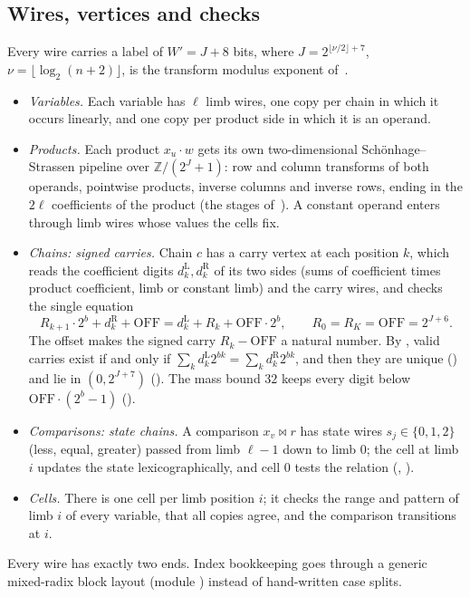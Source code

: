 \documentclass[10pt]{amsart}
\theoremstyle{plain}
\theoremstyle{definition}
\theoremstyle{remark}
\numberwithin{equation}{section}
\newcommand{\Z}{\mathbb{Z}}
\begin{document}
\subsection{Wires, vertices and checks}
Every wire carries a label of $W'=J+8$ bits, where $J=2^{\lfloor\nu/2\rfloor+7}$, $\nu=\lfloor\log_2(n+2)\rfloor$,
is the transform modulus exponent of~\cite{TulFac26}.
\begin{itemize}
\item \emph{Variables.} Each variable has $\ell$ limb wires, one copy per chain in which it occurs linearly,
and one copy per product side in which it is an operand.
\item \emph{Products.} Each product $x_u\cdot w$ gets its own two-dimensional Sch\"onhage--Strassen pipeline
over $\Z/(2^J+1)$: row and column transforms of both operands, pointwise products, inverse columns and
inverse rows, ending in the $2\ell$ coefficients of the product (the stages of~\cite[\S4]{TulFac26}).
A constant operand enters through limb wires whose values the cells fix.
\item \emph{Chains: signed carries.} Chain $c$ has a carry vertex at each position $k$, which reads the
coefficient digits $d^{\mathrm{L}}_k,d^{\mathrm{R}}_k$ of its two sides (sums of coefficient times product
coefficient, limb or constant limb) and the carry wires, and checks the single equation
\begin{equation}\label{eq:carry}
  R_{k+1}\cdot2^b+d^{\mathrm{R}}_k+\mathrm{OFF}=d^{\mathrm{L}}_k+R_k+\mathrm{OFF}\cdot2^b,
  \qquad R_0=R_K=\mathrm{OFF}=2^{J+6}.
\end{equation}
The offset makes the signed carry $R_k-\mathrm{OFF}$ a natural number. By , valid
carries exist if and only if $\sum_kd^{\mathrm{L}}_k2^{bk}=\sum_kd^{\mathrm{R}}_k2^{bk}$, and then they are
unique () and lie in $(0,2^{J+7})$ (). The mass bound $32$ keeps
every digit below $\mathrm{OFF}\cdot(2^b-1)$ ().
\item \emph{Comparisons: state chains.} A comparison $x_v\bowtie r$ has state wires $s_j\in\{0,1,2\}$
(less, equal, greater) passed from limb $\ell-1$ down to limb $0$; the cell at limb $i$ updates the state
lexicographically, and cell $0$ tests the relation (, ).
\item \emph{Cells.} There is one cell per limb position $i$; it checks the range and pattern of limb $i$ of
every variable, that all copies agree, and the comparison transitions at $i$.
\end{itemize}
Every wire has exactly two ends. Index bookkeeping goes through a generic mixed-radix block layout
(module ) instead of hand-written case splits.
\end{document}
